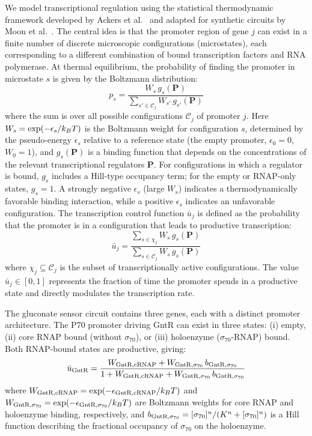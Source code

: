 We model transcriptional regulation using the statistical thermodynamic framework developed by Ackers et al.\ \cite{ackers1982quantitative} and adapted for synthetic circuits by Moon et al.\ \cite{moon2012genetic}. The central idea is that the promoter region of gene $j$ can exist in a finite number of discrete microscopic configurations (microstates), each corresponding to a different combination of bound transcription factors and RNA polymerase. At thermal equilibrium, the probability of finding the promoter in microstate $s$ is given by the Boltzmann distribution:
\begin{equation}
p_s = \frac{W_s\,g_s(\mathbf{P})}{\displaystyle\sum_{s' \in \mathcal{C}_j} W_{s'}\,g_{s'}(\mathbf{P})}
\label{eq:p_microstate}
\end{equation}
where the sum is over all possible configurations $\mathcal{C}_j$ of promoter $j$. Here $W_s = \exp(-\epsilon_s / k_BT)$ is the Boltzmann weight for configuration $s$, determined by the pseudo-energy $\epsilon_s$ relative to a reference state (the empty promoter, $\epsilon_0 = 0$, $W_0 = 1$), and $g_s(\mathbf{P})$ is a binding function that depends on the concentrations of the relevant transcriptional regulators $\mathbf{P}$. For configurations in which a regulator is bound, $g_s$ includes a Hill-type occupancy term; for the empty or RNAP-only states, $g_s = 1$. A strongly negative $\epsilon_s$ (large $W_s$) indicates a thermodynamically favorable binding interaction, while a positive $\epsilon_s$ indicates an unfavorable configuration. The transcription control function $\bar{u}_j$ is defined as the probability that the promoter is in a configuration that leads to productive transcription:
\begin{equation}
\boxed{\bar{u}_j = \frac{\displaystyle\sum_{s \in \chi_j} W_s\,g_s(\mathbf{P})}{\displaystyle\sum_{s \in \mathcal{C}_j} W_s\,g_s(\mathbf{P})}}
\label{eq:u_general}
\end{equation}
where $\chi_j \subseteq \mathcal{C}_j$ is the subset of transcriptionally active configurations. The value $\bar{u}_j \in [0, 1]$ represents the fraction of time the promoter spends in a productive state and directly modulates the transcription rate.

The gluconate sensor circuit contains three genes, each with a distinct promoter architecture. The P70 promoter driving GntR can exist in three states: (i) empty, (ii) core RNAP bound (without $\sigma_{70}$), or (iii) holoenzyme ($\sigma_{70}$-RNAP) bound. Both RNAP-bound states are productive, giving:
\begin{equation}
\bar{u}_{\text{GntR}} = \frac{W_{\text{GntR},\text{cRNAP}} + W_{\text{GntR},\sigma_{70}}\,b_{\text{GntR},\sigma_{70}}}{1 + W_{\text{GntR},\text{cRNAP}} + W_{\text{GntR},\sigma_{70}}\,b_{\text{GntR},\sigma_{70}}}
\label{eq:u_GntR}
\end{equation}
where $W_{\text{GntR},\text{cRNAP}} = \exp(-\epsilon_{\text{GntR},\text{cRNAP}}/k_BT)$ and $W_{\text{GntR},\sigma_{70}} = \exp(-\epsilon_{\text{GntR},\sigma_{70}}/k_BT)$ are Boltzmann weights for core RNAP and holoenzyme binding, respectively, and $b_{\text{GntR},\sigma_{70}} = [\sigma_{70}]^{n}/({K^{n} + [\sigma_{70}]^{n}})$ is a Hill function describing the fractional occupancy of $\sigma_{70}$ on the holoenzyme.

